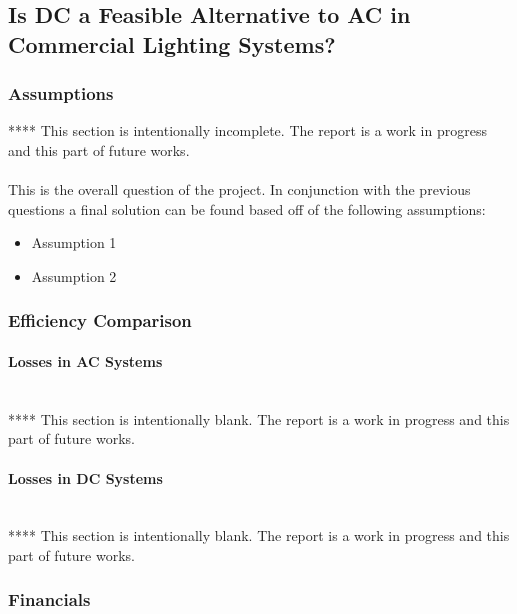 \subsection{Is DC a Feasible Alternative to AC in Commercial Lighting Systems?}

\subsubsection{Assumptions}
****
\newline
This section is intentionally incomplete. The report is a work in progress and this part of future works.  

\paragraph{}
This is the overall question of the project. In conjunction with the previous questions a final solution can be found based off of the following assumptions:

\begin{itemize}[noitemsep,nolistsep]
	\item Assumption 1
	\item Assumption 2
\end{itemize}

\subsubsection{Efficiency Comparison}

\paragraph{Losses in AC Systems}
~\\
****
\newline
This section is intentionally blank. The report is a work in progress and this part of future works.  

\paragraph{Losses in DC Systems}
~\\
****
\newline
This section is intentionally blank. The report is a work in progress and this part of future works.  

\subsubsection{Financials}

